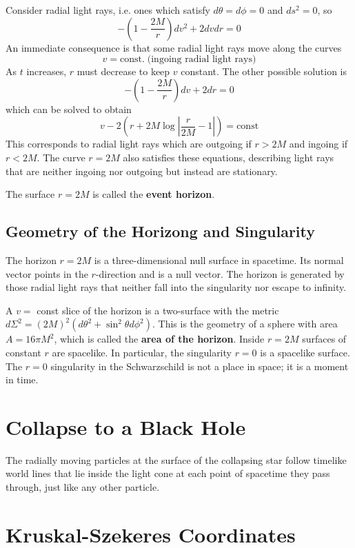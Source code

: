 Consider radial light rays, i.e. ones which satisfy $d\theta = d\phi = 0$ and $ds^2 = 0$, so $$-\left(1-\frac{2M}{r}\right)dv^2+2dvdr = 0$$
An immediate consequence is that some radial light rays move along the curves $$v = \text{const}.\;\text{(ingoing radial light rays)}$$
As $t$ increases, $r$ must decrease to keep $v$ constant. The other possible solution is $$-\left(1-\frac{2M}{r}\right)dv + 2dr = 0$$
which can be solved to obtain $$v-2\left(r+2M\log\left|\frac{r}{2M}-1\right|\right) = \text{const}$$
This corresponds to radial light rays which are outgoing if $r > 2M$ and ingoing if $r < 2M$. The curve $r = 2M$ also satisfies these equations, describing light rays that are neither ingoing nor outgoing but instead are stationary.

The surface $r = 2M$ is called the \textbf{event horizon}.


\subsection{Geometry of the Horizong and Singularity}

The horizon $r = 2M$ is a three-dimensional null surface in spacetime. Its normal vector points in the $r$-direction and is a null vector. The horizon is generated by those radial light rays that neither fall into the singularity nor escape to infinity.

A $v = $ const slice of the horizon is a two-surface with the metric $d\Sigma^2 = (2M)^2(d\theta^2+\sin^2\theta d\phi^2)$. This is the geometry of a sphere with area $A = 16\pi M^2$, which is called the \textbf{area of the horizon}. Inside $r = 2M$ surfaces of constant $r$ are spacelike. In particular, the singularity $r = 0$ is a spacelike surface. The $r = 0$ singularity in the Schwarzschild is not a place in space; it is a moment in time.


\section{Collapse to a Black Hole}


The radially moving particles at the surface of the collapsing star follow timelike world lines that lie inside the light cone at each point of spacetime they pass through, just like any other particle.



\section{Kruskal-Szekeres Coordinates}


